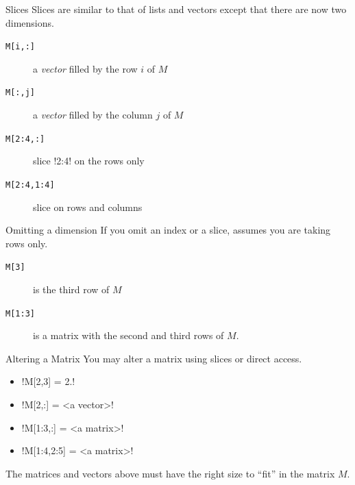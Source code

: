 \documentclass[hyperref={pdfpagelabels=false},table]{beamer}
\begin{document}

\begin{frame}[fragile]{Slices}
Slices are similar to that of lists and vectors \alert{except} that there are now \alert{two dimensions}.
\begin{description}
\item[\texttt{M[i,:]}] a \emph{vector} filled by the row $i$ of $M$
\item[\texttt{M[:,j]}] a \emph{vector} filled by the column $j$ of $M$
\item[\texttt{M[2:4,:]}] slice \pyth!2:4! on the rows only
\item[\texttt{M[2:4,1:4]}] slice on rows and columns
\end{description}

\begin{alertblock}{Omitting a dimension}
If you omit an index or a slice, \scipy \hspace{.2em} assumes you are taking \alert{rows only}.
\begin{description}
\item[\texttt{M[3]}] is the third row of $M$
\item[\texttt{M[1:3]}] is a matrix with the second and third rows of $M$.
\end{description}
\end{alertblock}
\end{frame}

\begin{frame}[fragile]{Altering a Matrix}
You may alter a matrix using slices or direct access.
\begin{itemize}
\item \pyth!M[2,3] = 2.!
\item \pyth!M[2,:] = <a vector>!
\item \pyth!M[1:3,:] = <a matrix>!
\item \pyth!M[1:4,2:5] = <a matrix>!
\end{itemize}
The matrices and vectors above \alert{must have the right size} to ``fit'' in the matrix $M$.
\end{frame}
\end{document}
